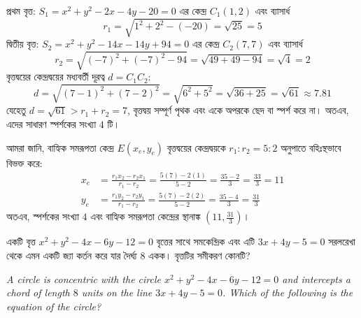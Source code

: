\documentclass[12pt, a4paper]{article}
\begin{document}
\begin{tcolorbox}[solutionbox={সমাধান (Solution)}]
    \noindent
    প্রথম বৃত্ত: $S_1 = x^2 + y^2 - 2x - 4y - 20 = 0$ এর কেন্দ্র $C_1(1, 2)$ এবং ব্যাসার্ধ 
    \[ r_1 = \sqrt{1^2 + 2^2 - (-20)} = \sqrt{25} = 5 \]
    দ্বিতীয় বৃত্ত: $S_2 = x^2 + y^2 - 14x - 14y + 94 = 0$ এর কেন্দ্র $C_2(7, 7)$ এবং ব্যাসার্ধ 
    \[ r_2 = \sqrt{(-7)^2 + (-7)^2 - 94} = \sqrt{49 + 49 - 94} = \sqrt{4} = 2 \]
    বৃত্তদ্বয়ের কেন্দ্রদ্বয়ের মধ্যবর্তী দূরত্ব $d = C_1C_2$:
    \[ d = \sqrt{(7 - 1)^2 + (7 - 2)^2} = \sqrt{6^2 + 5^2} = \sqrt{36 + 25} = \sqrt{61} \approx 7.81 \]
    যেহেতু $d = \sqrt{61} > r_1 + r_2 = 7$, বৃত্তদ্বয় সম্পূর্ণ পৃথক এবং একে অপরকে ছেদ বা স্পর্শ করে না। অতএব, এদের সাধারণ স্পর্শকের সংখ্যা $4$ টি।
    
    \vspace{0.5em}
    আমরা জানি, বাহ্যিক সমরূপতা কেন্দ্র $E(x_e, y_e)$ বৃত্তদ্বয়ের কেন্দ্রদ্বয়কে $r_1 : r_2 = 5 : 2$ অনুপাতে বহিঃস্থভাবে বিভক্ত করে:
    \begin{align*}
        x_e &= \frac{r_1 x_2 - r_2 x_1}{r_1 - r_2} = \frac{5(7) - 2(1)}{5 - 2} = \frac{35 - 2}{3} = \frac{33}{3} = 11 \\
        y_e &= \frac{r_1 y_2 - r_2 y_1}{r_1 - r_2} = \frac{5(7) - 2(2)}{5 - 2} = \frac{35 - 4}{3} = \frac{31}{3}
    \end{align*}
    অতএব, স্পর্শকের সংখ্যা $4$ এবং বাহ্যিক সমরূপতা কেন্দ্রের স্থানাঙ্ক $\left(11, \frac{31}{3}\right)$।
\end{tcolorbox}

\begin{tcolorbox}[questionbox={প্রশ্ন (Question) 2}]
    \noindent
    একটি বৃত্ত $x^2 + y^2 - 4x - 6y - 12 = 0$ বৃত্তের সাথে সমকেন্দ্রিক এবং এটি $3x + 4y - 5 = 0$ সরলরেখা থেকে এমন একটি জ্যা কর্তন করে যার দৈর্ঘ্য $8$ একক। বৃত্তটির সমীকরণ কোনটি?
    
    \vspace{0.8em}
    \begin{english}
    \noindent\textit{\color{darkgray}
    A circle is concentric with the circle $x^2 + y^2 - 4x - 6y - 12 = 0$ and intercepts a chord of length $8$ units on the line $3x + 4y - 5 = 0$. Which of the following is the equation of the circle?
    }
    \end{english}
\end{tcolorbox}
\end{document}
